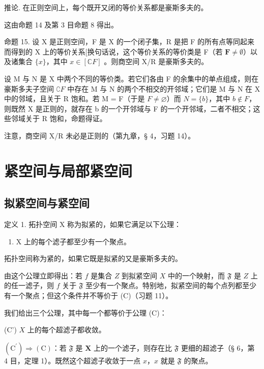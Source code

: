 推论. 在正则空间上，每个既开又闭的等价关系都是豪斯多夫的。

这由命题 14 及第 3 目命题 8 得出。

命题 15. 设 X 是正则空间，F 是 X 的一个闭子集，R 是把 F 的所有点等同起来而得到的 X 上的等价关系{[}换句话说，这个等价关系的等价类是 F（若 \(\mathbf{F} \neq \emptyset\)）以及诸集合 \(\{x\}\)，其中 \(x \in [\mathbb{C}F]\) 。则商空间 X/R 是豪斯多夫的。

设 M 与 N 是 X 中两个不同的等价类。若它们各由 F 的余集中的单点组成，则在豪斯多夫子空间 \(\complement F\) 中存在 M 与 N 的两个不相交的开邻域；它们是 M 与 N 在 X 中的邻域，且关于 R 饱和。若 M = F（于是 \(F \neq \varnothing\)）而 \(N = \{b\}\)，其中 \(b \notin F\)，则既然 X 是正则的，就存在 b 的一个开邻域与 F 的一个开邻域，二者不相交；这些邻域关于 R 饱和，命题得证。

注意，商空间 X/R 未必是正则的（第九章，§ 4，习题 14）。

\section{紧空间与局部紧空间}

\subsection{拟紧空间与紧空间}

定义 1. 拓扑空间 X 称为拟紧的，如果它满足以下公理：

\begin{enumerate}
\def\labelenumi{(\Alph{enumi})}
\setcounter{enumi}{2}
\tightlist
\item
  X 上的每个滤子都至少有一个聚点。
\end{enumerate}

拓扑空间称为紧的，如果它既是拟紧的又是豪斯多夫的。

由这个公理立即得出：若 \(f\) 是集合 \(Z\) 到拟紧空间 \(X\) 中的一个映射，而 \(\mathfrak{F}\) 是 \(Z\) 上的任一滤子，则 \(f\) 关于 \(\mathfrak{F}\) 至少有一个聚点。特别地，拟紧空间的每个点列都至少有一个聚点；但这个条件并不等价于 (C)（习题 11）。

我们给出三个公理，其中每一个都等价于公理 (C)：

(C') \(X\) 上的每个超滤子都收敛。

\((\mathrm{C}^{\prime}) \Longrightarrow (\mathrm{C})\)：若 \(\mathfrak{F}\) 是 \(\mathbf{X}\) 上的一个滤子，则存在比 \(\mathfrak{F}\) 更细的超滤子（§ 6，第 4 目，定理 1）。既然这个超滤子收敛于一点 \(x\)，\(x\) 就是 \(\mathfrak{F}\) 的聚点。

